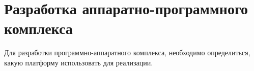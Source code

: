 \section{Разработка аппаратно-программного комплекса}

Для разработки программно-аппаратного комплекса, необходимо определиться, какую платформу использовать для реализации.







% 
%
